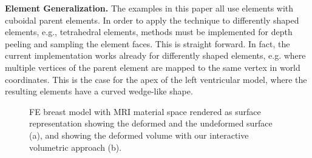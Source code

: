 \documentclass[journal]{vgtc}                %
\begin{document}
\noindent \textbf{Element Generalization.} The examples in this paper all use elements with cuboidal parent elements. In order to apply the technique to differently shaped elements, e.g., tetrahedral elements, methods must be implemented for depth peeling and sampling the element faces. This is straight forward. In fact, the current implementation works already for differently shaped elements, e.g. where multiple vertices of the parent element are mapped to the same vertex in world coordinates. This is the case for the apex of the left ventricular model, where the resulting elements have a curved wedge-like shape.  
%
\begin{figure}
    \centering 
    \caption{FE breast model with MRI material space rendered as surface representation showing the deformed and the undeformed surface (a), and showing the deformed volume with our interactive volumetric approach (b).}
    \label{fig:breast}
\end{figure}
%
\end{document}
